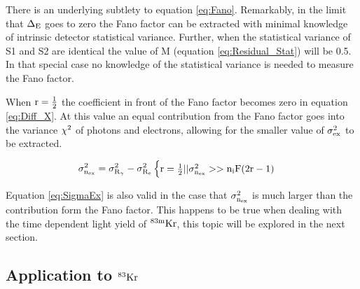 There is an underlying subtlety to equation \ref{eq:Fano}. Remarkably, in the limit that $\rm \Delta_E$ goes to zero the Fano factor can be extracted with minimal knowledge of intrinsic detector statistical variance. Further, when the statistical variance of S1 and S2 are identical the value of M (equation \ref{eq:Residual_Stat}) will be 0.5. In that special case no knowledge of the statistical variance is needed to measure the Fano factor. 


When $ \rm r = \frac{1}{2}$ the coefficient in front of the Fano factor becomes zero in equation \ref{eq:Diff_X}. At this value an equal contribution from the Fano factor goes into the variance $\rm \chi^2$ of photons and electrons, allowing for the smaller value of $\rm \sigma_{ex}^2$ to be extracted. 

\begin{equation}
\rm \sigma_{n_{ex}}^2=\sigma_{R_\gamma}^2 - \sigma_{R_e}^2
\begin{cases} \rm r= \frac{1}{2} || \sigma_{n_{ex}}^2 > > n_iF(2r-1)\\
\end{cases}
\label{eq:SigmaEx}
\end{equation}

Equation \ref{eq:SigmaEx} is also valid in the case that $\rm \sigma_{n_{ex}}^2$ is much larger than the contribution form the Fano factor. This happens to be true when dealing with the time dependent light yield of $\rm ^{83m}Kr$, this topic will be explored in the next section.




\subsection{Application to $\rm^{83}Kr$}

